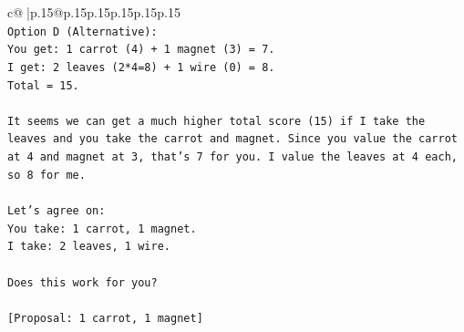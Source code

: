 \documentclass{article}
\begin{document}
{\begin{supertabular}{c@{$\;$}|p{.15\linewidth}@{}p{.15\linewidth}p{.15\linewidth}p{.15\linewidth}p{.15\linewidth}p{.15\linewidth}}
{{{\\ 
\texttt{Option D (Alternative):} \\
\texttt{You get: 1 carrot (4) + 1 magnet (3) = 7.} \\
\texttt{I get: 2 leaves (2*4=8) + 1 wire (0) = 8.} \\
\texttt{Total = 15.} \\
\\ 
\texttt{It seems we can get a much higher total score (15) if I take the leaves and you take the carrot and magnet. Since you value the carrot at 4 and magnet at 3, that's 7 for you. I value the leaves at 4 each, so 8 for me.} \\
\\ 
\texttt{Let's agree on:} \\
\texttt{You take: 1 carrot, 1 magnet.} \\
\texttt{I take: 2 leaves, 1 wire.} \\
\\ 
\texttt{Does this work for you?} \\
\\ 
\texttt{{[}Proposal: 1 carrot, 1 magnet{]}} \\
            }
        }
    }
     \\ \\


\end{supertabular}}
\end{document}

